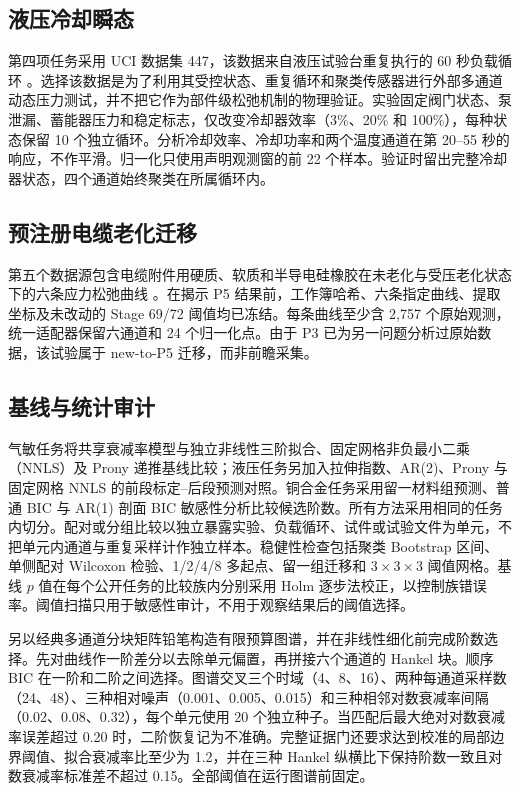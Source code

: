 \documentclass[UTF8,11pt]{ctexart}
\begin{document}
\subsection{液压冷却瞬态}
第四项任务采用 UCI 数据集 447，该数据来自液压试验台重复执行的 60 秒负载循环 \cite{helwig2018hydraulic}。选择该数据是为了利用其受控状态、重复循环和聚类传感器进行外部多通道动态压力测试，并不把它作为部件级松弛机制的物理验证。实验固定阀门状态、泵泄漏、蓄能器压力和稳定标志，仅改变冷却器效率（3\%、20\% 和 100\%），每种状态保留 10 个独立循环。分析冷却效率、冷却功率和两个温度通道在第 20--55 秒的响应，不作平滑。归一化只使用声明观测窗的前 22 个样本。验证时留出完整冷却器状态，四个通道始终聚类在所属循环内。

\subsection{预注册电缆老化迁移}
第五个数据源包含电缆附件用硬质、软质和半导电硅橡胶在未老化与受压老化状态下的六条应力松弛曲线 \cite{kayanja2026cableageing}。在揭示 P5 结果前，工作簿哈希、六条指定曲线、提取坐标及未改动的 Stage 69/72 阈值均已冻结。每条曲线至少含 2,757 个原始观测，统一适配器保留六通道和 24 个归一化点。由于 P3 已为另一问题分析过原始数据，该试验属于 new-to-P5 迁移，而非前瞻采集。

\subsection{基线与统计审计}
气敏任务将共享衰减率模型与独立非线性三阶拟合、固定网格非负最小二乘（NNLS）及 Prony 递推基线比较；液压任务另加入拉伸指数、AR(2)、Prony 与固定网格 NNLS 的前段标定--后段预测对照。铜合金任务采用留一材料组预测、普通 BIC 与 AR(1) 剖面 BIC 敏感性分析比较候选阶数。所有方法采用相同的任务内切分。配对或分组比较以独立暴露实验、负载循环、试件或试验文件为单元，不把单元内通道与重复采样计作独立样本。稳健性检查包括聚类 Bootstrap 区间、单侧配对 Wilcoxon 检验、1/2/4/8 多起点、留一组迁移和 $3\times3\times3$ 阈值网格。基线 $p$ 值在每个公开任务的比较族内分别采用 Holm 逐步法校正，以控制族错误率。阈值扫描只用于敏感性审计，不用于观察结果后的阈值选择。

另以经典多通道分块矩阵铅笔构造有限预算图谱，并在非线性细化前完成阶数选择。先对曲线作一阶差分以去除单元偏置，再拼接六个通道的 Hankel 块。顺序 BIC 在一阶和二阶之间选择。图谱交叉三个时域（4、8、16）、两种每通道采样数（24、48）、三种相对噪声（0.001、0.005、0.015）和三种相邻对数衰减率间隔（0.02、0.08、0.32），每个单元使用 20 个独立种子。当匹配后最大绝对对数衰减率误差超过 0.20 时，二阶恢复记为不准确。完整证据门还要求达到校准的局部边界阈值、拟合衰减率比至少为 1.2，并在三种 Hankel 纵横比下保持阶数一致且对数衰减率标准差不超过 0.15。全部阈值在运行图谱前固定。
\end{document}
